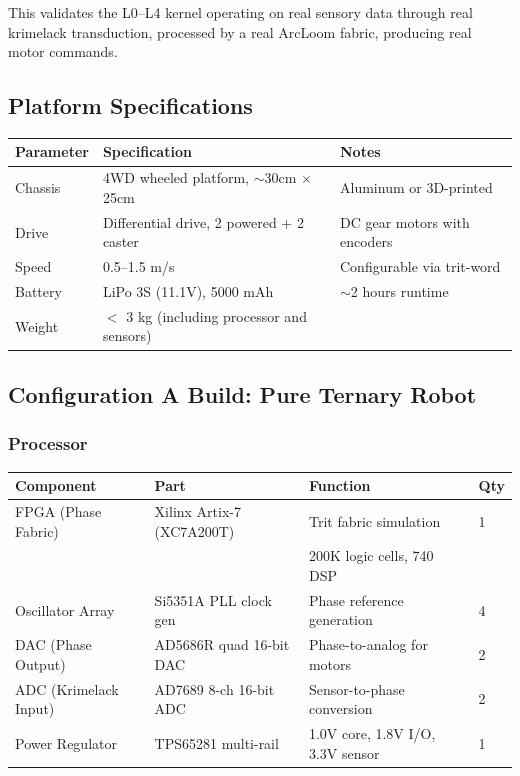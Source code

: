 \documentclass[11pt, a4paper]{article}
\begin{document}
This validates the L0--L4 kernel operating on real sensory data through
real krimelack transduction, processed by a real ArcLoom fabric, producing
real motor commands.

\subsection{Platform Specifications}

\begin{center}
\begin{tabular}{@{}lll@{}}
\toprule
\textbf{Parameter} & \textbf{Specification} & \textbf{Notes} \\
\midrule
Chassis & 4WD wheeled platform, $\sim$30cm $\times$ 25cm & Aluminum or 3D-printed \\
Drive & Differential drive, 2 powered + 2 caster & DC gear motors with encoders \\
Speed & 0.5--1.5 m/s & Configurable via trit-word \\
Battery & LiPo 3S (11.1V), 5000 mAh & $\sim$2 hours runtime \\
Weight & $<$ 3 kg (including processor and sensors) & \\
\bottomrule
\end{tabular}
\end{center}

\subsection{Configuration A Build: Pure Ternary Robot}

\subsubsection{Processor}

\begin{center}
\begin{tabular}{@{}llll@{}}
\toprule
\textbf{Component} & \textbf{Part} & \textbf{Function} & \textbf{Qty} \\
\midrule
FPGA (Phase Fabric) & Xilinx Artix-7 (XC7A200T) & Trit fabric simulation & 1 \\
                    &                             & 200K logic cells, 740 DSP & \\
Oscillator Array & Si5351A PLL clock gen & Phase reference generation & 4 \\
DAC (Phase Output) & AD5686R quad 16-bit DAC & Phase-to-analog for motors & 2 \\
ADC (Krimelack Input) & AD7689 8-ch 16-bit ADC & Sensor-to-phase conversion & 2 \\
Power Regulator & TPS65281 multi-rail & 1.0V core, 1.8V I/O, 3.3V sensor & 1 \\
\bottomrule
\end{tabular}
\end{center}
\end{document}
